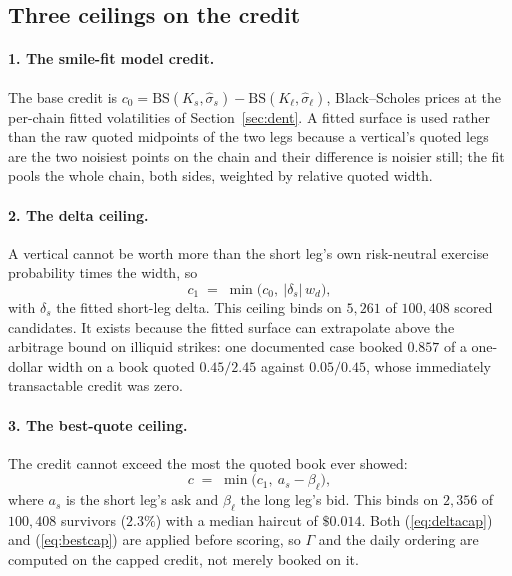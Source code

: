 \documentclass[11pt]{article}
\begin{document}
\subsection{Three ceilings on the credit}
\label{sec:ceilings}

\paragraph{1. The smile-fit model credit.} The base credit is
$c_0 = \mathrm{BS}(K_s, \hat\sigma_s) - \mathrm{BS}(K_\ell, \hat\sigma_\ell)$,
Black--Scholes prices at the per-chain fitted volatilities of
Section~\ref{sec:dent}. A fitted surface is used rather than the raw quoted
midpoints of the two legs because a vertical's quoted legs are the two noisiest
points on the chain and their difference is noisier still; the fit pools the
whole chain, both sides, weighted by relative quoted width.

\paragraph{2. The delta ceiling.} A vertical cannot be worth more than the
short leg's own risk-neutral exercise probability times the width, so
\begin{equation}
c_1 \;=\; \min\bigl(c_0,\ |\delta_s|\, w_d\bigr),
\label{eq:deltacap}
\end{equation}
with $\delta_s$ the fitted short-leg delta. This ceiling binds on $5{,}261$ of
$100{,}408$ scored candidates. It exists because the fitted surface can
extrapolate above the arbitrage bound on illiquid strikes: one documented case
booked $0.857$ of a one-dollar width on a book quoted $0.45/2.45$ against
$0.05/0.45$, whose immediately transactable credit was zero.

\paragraph{3. The best-quote ceiling.} The credit cannot exceed the most the
quoted book ever showed:
\begin{equation}
c \;=\; \min\bigl(c_1,\ a_s - \beta_\ell\bigr),
\label{eq:bestcap}
\end{equation}
where $a_s$ is the short leg's ask and $\beta_\ell$ the long leg's bid. This
binds on $2{,}356$ of $100{,}408$ survivors ($2.3\%$) with a median haircut of
$\$0.014$. Both
(\ref{eq:deltacap}) and (\ref{eq:bestcap}) are applied before scoring, so
$\Gamma$ and the daily ordering are computed on the capped credit, not merely
booked on it.
\end{document}
